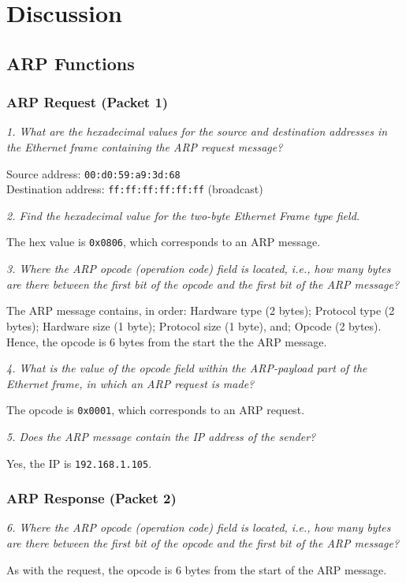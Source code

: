 \section{Discussion}\label{sec:discussion}
\subsection{ARP Functions}
\subsubsection{ARP Request (Packet 1)}
\textit{1. What are the hexadecimal values for the source and destination addresses in the Ethernet frame containing the ARP request message?}

Source address: \texttt{00:d0:59:a9:3d:68} \\
Destination address: \texttt{ff:ff:ff:ff:ff:ff} (broadcast)

\textit{2. Find the hexadecimal value for the two-byte Ethernet Frame type field.}

The hex value is \texttt{0x0806}, which corresponds to an ARP message.

\textit{3. Where the ARP opcode (operation code) field is located, i.e., how many bytes are there between the first bit of the opcode and the first bit of the ARP message?}

The ARP message contains, in order: Hardware type (2 bytes); Protocol type (2 bytes); Hardware size (1 byte); Protocol size (1 byte), and; Opcode (2 bytes). Hence, the opcode is 6 bytes from the start the the ARP message.

\textit{4. What is the value of the opcode field within the ARP-payload part of the Ethernet frame, in which an ARP request is made?}

The opcode is \texttt{0x0001}, which corresponds to an ARP request.

\textit{5. Does the ARP message contain the IP address of the sender?}

Yes, the IP is \texttt{192.168.1.105}.

\pagebreak
\subsubsection{ARP Response (Packet 2)}
\textit{6. Where the ARP opcode (operation code) field is located, i.e., how many bytes are there between the first bit of the opcode and the first bit of the ARP message?}

As with the request, the opcode is 6 bytes from the start of the ARP message.

